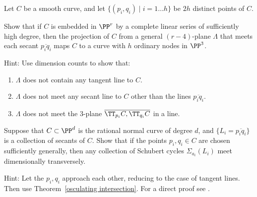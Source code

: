 \begin{exercise}
\label{independent secants}
\label{Constructing nodal curves} 
Let $C$ be a smooth curve,
and let
 $\{(p_{i}, q_{i}) \mid i = 1\dots h\}$ be $2h$ distinct points of $C$.

Show that if $C$ is embedded in $\PP^{r}$ by a complete linear series
of sufficiently high degree, then the
projection of $C$ from a general $(r-4)$-plane $\Lambda$ that meets each
secant $\overline{p_{i} q_{i}}$
maps $C$ to a curve with $h$ ordinary nodes in $\PP^{3}$.

Hint: Use dimension counts to show that:
\begin{enumerate}
\item $\Lambda$ does not contain any tangent line to $C$.
\item $\Lambda$ does not meet any secant line to $C$ other than the
lines  $\overline{p_{i} q_{i}}$.
\item $\Lambda$ does not meet the 3-plane $\overline{\TT_{p_i}C,
\TT_{q_i}C}$ in a line.
\end{enumerate}
 \end{exercise}

\begin{exercise}\label{BN via nodal curves}\label{secant general position}
Suppose that $C\subset \PP^{d}$ is the rational normal curve of degree
$d$, and $\{L_{i} = \overline{p_{i}q_{i}}\}$
is a collection of secants of $C$. Show that if the points $p_{i},
q_{i}\in C$ are chosen sufficiently generally,
then any collection of Schubert cycles $\Sigma_{a_{i}}(L_{i})$ meet
dimensionally transversely.

Hint: Let the $p_{i}, q_{i}$ approach each other, reducing to the case
of tangent lines. Then use
Theorem~\ref{osculating intersection}. For a direct proof see \cite[Lemma,
p.~259]{Griffiths-Harris-BN}.
\end{exercise}

